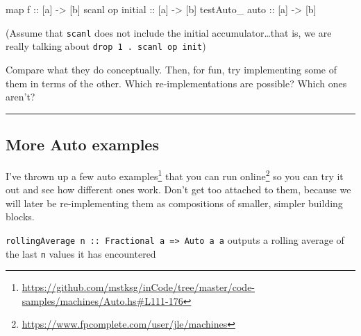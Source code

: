 \documentclass[]{article}
\newenvironment{Shaded}{\begin{snugshade}}{\end{snugshade}}
\newcommand{\NormalTok}[1]{#1}
\newcommand{\OtherTok}[1]{\textcolor[rgb]{0.56,0.35,0.01}{#1}}
\renewcommand{\href}[2]{#2\footnote{\url{#1}}}
\begin{document}
\begin{Shaded}
\begin{Highlighting}[]
\NormalTok{map}\OtherTok{       f          ::}\NormalTok{ [a] }\OtherTok{->}\NormalTok{ [b]}
\NormalTok{scanl     op}\OtherTok{ initial ::}\NormalTok{ [a] }\OtherTok{->}\NormalTok{ [b]}
\NormalTok{testAuto_}\OtherTok{ auto       ::}\NormalTok{ [a] }\OtherTok{->}\NormalTok{ [b]}
\end{Highlighting}
\end{Shaded}

(Assume that \texttt{scanl} does not include the initial accumulator\ldots{}that
is, we are really talking about \texttt{drop\ 1\ .\ scanl\ op\ init})

Compare what they do conceptually. Then, for fun, try implementing some of them
in terms of the other. Which re-implementations are possible? Which ones aren't?

\begin{center}\rule{0.5\linewidth}{\linethickness}\end{center}

\hypertarget{more-auto-examples}{%
\subsection{More Auto examples}\label{more-auto-examples}}

\href{https://github.com/mstksg/inCode/tree/master/code-samples/machines/Auto.hs\#L111-176}{I've
thrown up a few auto examples}
\href{https://www.fpcomplete.com/user/jle/machines}{that you can run online} so
you can try it out and see how different ones work. Don't get too attached to
them, because we will later be re-implementing them as compositions of smaller,
simpler building blocks.

\begin{description}
\tightlist
\item[\href{https://github.com/mstksg/inCode/tree/master/code-samples/machines/Auto.hs\#L111-122}{rollingAverage}]
\texttt{rollingAverage\ n\ ::\ Fractional\ a\ =\textgreater{}\ Auto\ a\ a}
outputs a rolling average of the last \texttt{n} values it has encountered
\end{description}
\end{document}
